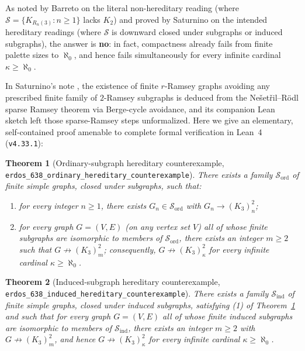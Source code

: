 \documentclass[11pt]{amsart}
\newtheorem{theorem}{Theorem}
\theoremstyle{definition}
\theoremstyle{remark}
\begin{document}
As noted by Barreto \cite{Forum638} on the literal non-hereditary reading (where $\mathcal{S} = \{K_{R_n(3)} : n \ge 1\}$ lacks $K_2$) and proved by Saturnino \cite{Forum638} on the intended hereditary readings (where $\mathcal{S}$ is downward closed under subgraphs or induced subgraphs), the answer is \textbf{no}: in fact, compactness already fails from finite palette sizes to $\aleph_0$, and hence fails simultaneously for every infinite cardinal $\kappa \ge \aleph_0$.

In Saturnino's note \cite{Forum638}, the existence of finite $r$-Ramsey graphs avoiding any prescribed finite family of $2$-Ramsey subgraphs is deduced from the Ne\v{s}et\v{r}il--R\"odl sparse Ramsey theorem via Berge-cycle avoidance, and its companion Lean sketch left those sparse-Ramsey steps unformalized. Here we give an elementary, self-contained proof amenable to complete formal verification in Lean~4 (\texttt{v4.33.1}):

\begin{theorem}[Ordinary-subgraph hereditary counterexample, \texttt{erdos\_638\_ordinary\_hereditary\_counterexample}]\label{thm:ord}
There exists a family $\mathcal{S}_{\mathrm{ord}}$ of finite simple graphs, closed under subgraphs, such that:
\begin{enumerate}
  \item for every integer $n \ge 1$, there exists $G_n \in \mathcal{S}_{\mathrm{ord}}$ with $G_n \to (K_3)^2_n$;
  \item for every graph $G = (V, E)$ (on any vertex set $V$) all of whose finite subgraphs are isomorphic to members of $\mathcal{S}_{\mathrm{ord}}$, there exists an integer $m \ge 2$ such that $G \not\to (K_3)^2_m$; consequently, $G \not\to (K_3)^2_\kappa$ for every infinite cardinal $\kappa \ge \aleph_0$.
\end{enumerate}
\end{theorem}

\begin{theorem}[Induced-subgraph hereditary counterexample, \texttt{erdos\_638\_induced\_hereditary\_counterexample}]\label{thm:ind}
There exists a family $\mathcal{S}_{\mathrm{ind}}$ of finite simple graphs, closed under induced subgraphs, satisfying (1) of Theorem~\ref{thm:ord} and such that for every graph $G = (V, E)$ all of whose finite induced subgraphs are isomorphic to members of $\mathcal{S}_{\mathrm{ind}}$, there exists an integer $m \ge 2$ with $G \not\to (K_3)^2_m$, and hence $G \not\to (K_3)^2_\kappa$ for every infinite cardinal $\kappa \ge \aleph_0$.
\end{theorem}
\end{document}
